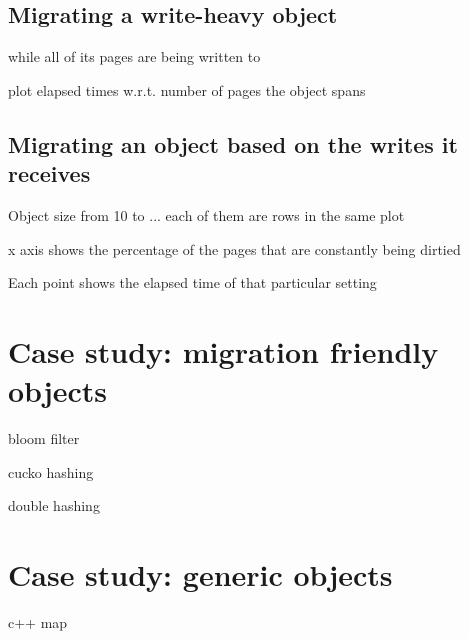 \subsection{Migrating a write-heavy object}
while all of its pages are being written to

plot elapsed times w.r.t. number of pages the object spans

\subsection{Migrating an object based on the writes it receives}
Object size from 10 to ... each of them are rows in the same plot

x axis shows the percentage of the pages that are constantly being dirtied

Each point shows the elapsed time of that particular setting


\section{Case study: migration friendly objects}

bloom filter

cucko hashing

double hashing

\section{Case study: generic objects}

c++ map



